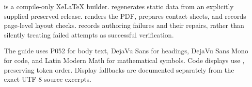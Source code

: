  is a compile-only XeLaTeX builder.  regenerates static data from an explicitly supplied preserved release.  renders the PDF, prepares contact sheets, and records page-level layout checks.  records authoring failures and their repairs, rather than silently treating failed attempts as successful verification.

The guide uses P052 for body text, DejaVu Sans for headings, DejaVu Sans Mono for code, and Latin Modern Math for mathematical symbols. Code displays use , preserving token order. Display fallbacks are documented separately from the exact UTF-8 source excerpts.

